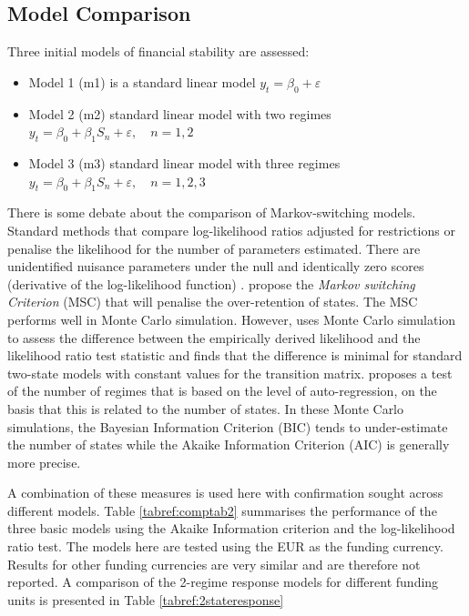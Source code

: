 \documentclass[12pt, a4paper, oneside]{article}\usepackage[]{graphicx}\usepackage[]{color}
\begin{document}
\subsection{Model Comparison}
Three initial models of financial stability are assessed: 
\begin{itemize}
\item Model 1 (m1) is a standard linear model $y_t = \beta_0  + \varepsilon$
\item Model 2 (m2) standard linear model with two regimes $y_t = \beta_0 + \beta_1 S_n + \varepsilon, \quad n = 1, 2$
\item Model 3 (m3) standard linear model with three regimes $y_t = \beta_0 + \beta_1 S_n + \varepsilon, \quad n = 1, 2, 3$
\end{itemize}

There is some debate about the comparison of Markov-switching models.  Standard methods that compare log-likelihood ratios adjusted for restrictions or penalise the likelihood for the number of parameters estimated.  There are unidentified nuisance parameters under the null and identically zero scores (derivative of the log-likelihood function) \citet{hansen1992likelihood}.   \citet{Smith2006553} propose the \emph{Markov switching Criterion} (MSC) that will penalise the over-retention of states.  The MSC performs well in Monte Carlo simulation.  However, \citep{garcia1998asymptotic} uses Monte Carlo simulation to assess the difference between the empirically derived likelihood and the likelihood ratio test statistic and finds that the difference is minimal for standard two-state models with constant values for the transition matrix. \citet{citeulike:13372807} proposes a test of the number of regimes that is based on the level of auto-regression, on the basis that this is related to the number of states.  In these Monte Carlo simulations, the Bayesian Information Criterion (BIC) tends to under-estimate the number of states while the Akaike Information Criterion (AIC) is generally more precise. 

A combination of these measures is used here with confirmation sought across different models.  Table \ref{tabref:comptab2} summarises the performance of the three basic models using the Akaike Information criterion and the log-likelihood ratio test.  The models here are tested using the EUR as the funding currency.  Results for other funding currencies are very similar and are therefore not reported.  A comparison of the 2-regime response models for different funding units is presented in Table \ref{tabref:2stateresponse} 
\end{document}
